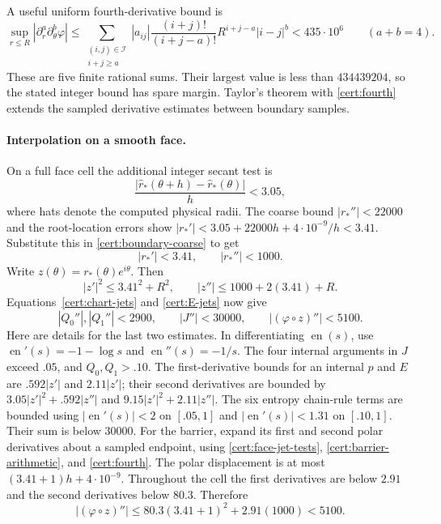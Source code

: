 \documentclass[11pt]{article}
\numberwithin{equation}{section}
\theoremstyle{definition}
\theoremstyle{remark}
\DeclareMathOperator{\en}{en}
\begin{document}
A useful uniform fourth-derivative bound is
\begin{equation}\label{cert:fourth}
 \sup_{r\leq R}|\partial_r^a\partial_\theta^b\varphi|
 \leq\sum_{\substack{(i,j)\in\mathcal I\\i+j\geq a}}
 |a_{ij}|\frac{(i+j)!}{(i+j-a)!}R^{i+j-a}|i-j|^b
 <435\cdot10^6\qquad(a+b=4).
\end{equation}
These are five finite rational sums.  Their largest value is less than
$434439204$, so the stated integer bound has spare margin.  Taylor's
theorem with \eqref{cert:fourth} extends the sampled derivative estimates
between boundary samples.

\paragraph{Interpolation on a smooth face.}
On a full face cell the additional integer secant test is
\[
 \frac{|\widehat r_*(\theta+h)-\widehat r_*(\theta)|}{h}<3.05,
\]
where hats denote the computed physical radii.  The coarse bound
$|r_*''|<22000$ and the root-location errors show
$|r_*'|<3.05+22000h+4\cdot10^{-9}/h<3.41$.  Substitute this in
\eqref{cert:boundary-coarse} to get
\begin{equation}\label{cert:boundary-fine}
 |r_*'|<3.41,\qquad |r_*''|<1000.
\end{equation}
Write $z(\theta)=r_*(\theta)e^{i\theta}$.  Then
\[
 |z'|^2\leq3.41^2+R^2,\qquad |z''|\leq1000+2(3.41)+R.
\]
Equations~\eqref{cert:chart-jets} and \eqref{cert:E-jets} now give
\begin{equation}\label{cert:face-curvature}
 |Q_0''|,|Q_1''|<2900,\qquad |J''|<30000,\qquad
 |(\varphi\circ z)''|<5100.
\end{equation}
Here are details for the last two estimates.  In differentiating $\en(s)$,
use $\en'(s)=-1-\log s$ and $\en''(s)=-1/s$.
The four internal arguments in $J$ exceed $.05$, and $Q_0,Q_1>.10$.
The first-derivative bounds for an internal $p$ and $E$ are
$.592|z'|$ and $2.11|z'|$; their second derivatives are bounded by
$3.05|z'|^2+.592|z''|$ and $9.15|z'|^2+2.11|z''|$.
The six entropy chain-rule terms are bounded using
$|\en'(s)|<2$ on $[.05,1]$ and $|\en'(s)|<1.31$ on $[.10,1]$.
Their sum is below 30000.  For the barrier, expand its first and second
polar derivatives about a sampled endpoint, using
\eqref{cert:face-jet-tests}, \eqref{cert:barrier-arithmetic}, and
\eqref{cert:fourth}.  The polar displacement is at most
$(3.41+1)h+4\cdot10^{-9}$.  Throughout the cell the first derivatives
are below $2.91$ and the second derivatives below $80.3$.  Therefore
\[
 |(\varphi\circ z)''|
 \leq80.3(3.41+1)^2+2.91(1000)<5100.
\]
\end{document}
